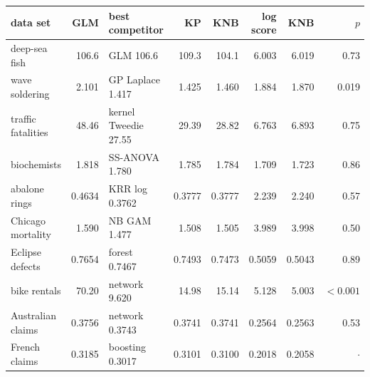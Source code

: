 \begin{tabular}{@{}lrlrrrrr@{}}
\toprule
data set & GLM & best competitor & KP & KNB & log score & KNB & $p$ \\
\midrule
deep-sea fish & 106.6 & GLM 106.6 & 109.3 & 104.1 & 6.003 & 6.019 & 0.73 \\
wave soldering & 2.101 & GP Laplace 1.417 & 1.425 & 1.460 & 1.884 & 1.870 & 0.019 \\
traffic fatalities & 48.46 & kernel Tweedie 27.55 & 29.39 & 28.82 & 6.763 & 6.893 & 0.75 \\
biochemists & 1.818 & SS-ANOVA 1.780 & 1.785 & 1.784 & 1.709 & 1.723 & 0.86 \\
abalone rings & 0.4634 & KRR log 0.3762 & 0.3777 & 0.3777 & 2.239 & 2.240 & 0.57 \\
Chicago mortality & 1.590 & NB GAM 1.477 & 1.508 & 1.505 & 3.989 & 3.998 & 0.50 \\
Eclipse defects & 0.7654 & forest 0.7467 & 0.7493 & 0.7473 & 0.5059 & 0.5043 & 0.89 \\
bike rentals & 70.20 & network 9.620 & 14.98 & 15.14 & 5.128 & 5.003 & $<0.001$ \\
Australian claims & 0.3756 & network 0.3743 & 0.3741 & 0.3741 & 0.2564 & 0.2563 & 0.53 \\
French claims & 0.3185 & boosting 0.3017 & 0.3101 & 0.3100 & 0.2018 & 0.2058 & $\cdot$ \\
\bottomrule
\end{tabular}
